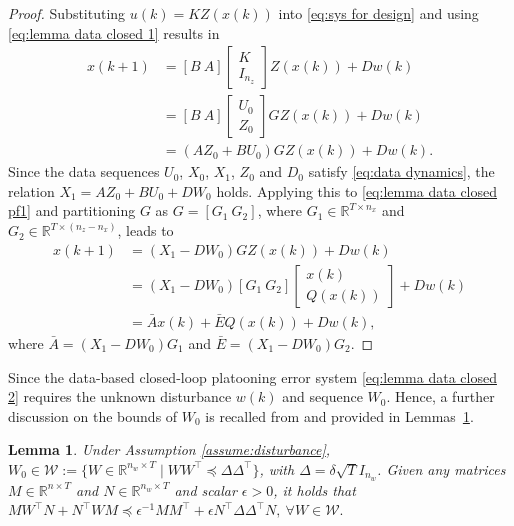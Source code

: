 \documentclass[letterpaper, 10 pt, conference]{ieeeconf}
\newtheorem{lemma}{Lemma}[section]
\begin{document}
	\begin{proof}
		Substituting $u(k) = K Z(x(k))$ into \eqref{eq:sys for design} and using 
		\eqref{eq:lemma data closed 1} results in
		\begin{align}\label{eq:lemma data closed pf1}
			x(k+1) &= [B ~ A] \begin{bmatrix} K \\ I_{n_z} \end{bmatrix} Z(x(k)) + D w(k) \nonumber\\
			&= [B ~ A] \begin{bmatrix} U_0 \\ Z_0 \end{bmatrix} G Z(x(k)) + D w(k) \nonumber\\
			&= (A Z_0 + B U_0) G Z(x(k)) + D w(k).
		\end{align}
		Since the data sequences $U_0$, $X_0$, $X_1$, $Z_0$ and $D_0$ satisfy \eqref{eq:data dynamics}, the relation $X_1 = A Z_0 + B U_0 + D W_0$ holds. Applying this to \eqref{eq:lemma data closed pf1} and 
		partitioning $G$ as $G = [G_1 ~ G_2]$, where $G_1 \in \mathbb{R}^{T \times 
			n_x}$ and $G_2 \in \mathbb{R}^{T \times (n_z-n_x)}$, leads to
		\begin{align}\label{eq:lemma data closed pf2}
			x(k+1) &= (X_1 - D W_0)G Z(x(k)) + D w(k) \nonumber\\
			&= (X_1 - D W_0) [G_1 ~ G_2] \begin{bmatrix} x(k) \\ Q(x(k)) \end{bmatrix} + D 
			w(k) \nonumber\\
			&= \bar{A} x(k) + \bar{E} Q(x(k)) + D w(k),
		\end{align}
		where $\bar{A} = (X_1 - D W_0) G_1$ and $\bar{E} = (X_1 - D W_0) G_2$. 
	\end{proof}	

	
Since the data-based closed-loop platooning error system \eqref{eq:lemma data closed 2} requires the unknown disturbance $w(k)$ and sequence $W_0$. Hence, a further discussion on the bounds of $W_0$ is recalled from \cite[Lemma 4]{Persis+23} and provided in Lemmas~\ref{lemma:disturbance bound}.  
	\begin{lemma}\label{lemma:disturbance bound}	
		Under Assumption \ref{assume:disturbance}, $W_0 \in \mathcal{W} := \{W \in \mathbb{R}^{n_w \times T} \mid W 
		W^\top \preceq \Delta \Delta^\top \}$, with $\Delta = \delta \sqrt{T} I_{n_w}$. 
		Given any 
		matrices $M \in \mathbb{R}^{n \times T}$ and $N \in \mathbb{R}^{n_w \times T}$ 
		and scalar $\epsilon > 0$, it holds that
		$	M W^\top N + N^\top W M \preceq \epsilon^{-1} M M^\top + \epsilon N^\top \Delta 
			\Delta^\top N, ~ \forall W \in \mathcal{W}. $
	\end{lemma}
	
\end{document}
